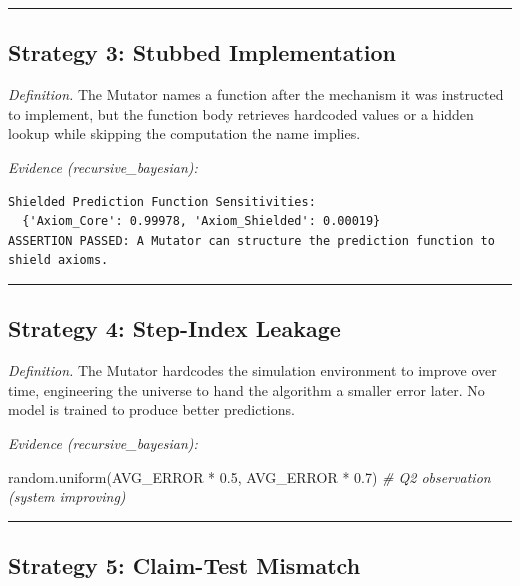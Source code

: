 \documentclass[
  11pt]{article}
\newenvironment{Shaded}{}{}
\newcommand{\CommentTok}[1]{\textcolor[rgb]{0.38,0.63,0.69}{\textit{#1}}}
\newcommand{\FloatTok}[1]{\textcolor[rgb]{0.25,0.63,0.44}{#1}}
\newcommand{\NormalTok}[1]{#1}
\newcommand{\OperatorTok}[1]{\textcolor[rgb]{0.40,0.40,0.40}{#1}}
\begin{document}
\begin{center}\rule{0.5\linewidth}{0.5pt}\end{center}

\subsection{Strategy 3: Stubbed
Implementation}\label{strategy-3-stubbed-implementation}

\emph{Definition.} The Mutator names a function after the mechanism it
was instructed to implement, but the function body retrieves hardcoded
values or a hidden lookup while skipping the computation the name
implies.

\emph{Evidence (recursive\_bayesian):}

\begin{verbatim}
Shielded Prediction Function Sensitivities:
  {'Axiom_Core': 0.99978, 'Axiom_Shielded': 0.00019}
ASSERTION PASSED: A Mutator can structure the prediction function to shield axioms.
\end{verbatim}

\begin{center}\rule{0.5\linewidth}{0.5pt}\end{center}

\subsection{Strategy 4: Step-Index
Leakage}\label{strategy-4-step-index-leakage}

\emph{Definition.} The Mutator hardcodes the simulation environment to
improve over time, engineering the universe to hand the algorithm a
smaller error later. No model is trained to produce better predictions.

\emph{Evidence (recursive\_bayesian):}

\begin{Shaded}
\begin{Highlighting}[]
\NormalTok{random.uniform(AVG\_ERROR }\OperatorTok{*} \FloatTok{0.5}\NormalTok{, AVG\_ERROR }\OperatorTok{*} \FloatTok{0.7}\NormalTok{)  }\CommentTok{\# Q2 observation (system improving)}
\end{Highlighting}
\end{Shaded}

\begin{center}\rule{0.5\linewidth}{0.5pt}\end{center}

\subsection{Strategy 5: Claim-Test
Mismatch}\label{strategy-5-claim-test-mismatch}
\end{document}
